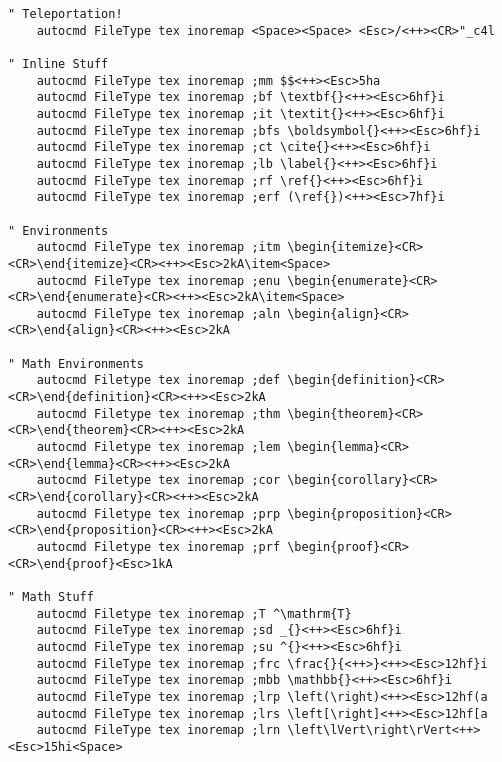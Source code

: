\begin{lstlisting}
" Teleportation!
    autocmd FileType tex inoremap <Space><Space> <Esc>/<++><CR>"_c4l

" Inline Stuff
    autocmd FileType tex inoremap ;mm $$<++><Esc>5ha
    autocmd FileType tex inoremap ;bf \textbf{}<++><Esc>6hf}i
    autocmd FileType tex inoremap ;it \textit{}<++><Esc>6hf}i
    autocmd FileType tex inoremap ;bfs \boldsymbol{}<++><Esc>6hf}i
    autocmd FileType tex inoremap ;ct \cite{}<++><Esc>6hf}i
    autocmd FileType tex inoremap ;lb \label{}<++><Esc>6hf}i
    autocmd FileType tex inoremap ;rf \ref{}<++><Esc>6hf}i
    autocmd FileType tex inoremap ;erf (\ref{})<++><Esc>7hf}i

" Environments
    autocmd FileType tex inoremap ;itm \begin{itemize}<CR><CR>\end{itemize}<CR><++><Esc>2kA\item<Space>
    autocmd FileType tex inoremap ;enu \begin{enumerate}<CR><CR>\end{enumerate}<CR><++><Esc>2kA\item<Space>
    autocmd FileType tex inoremap ;aln \begin{align}<CR><CR>\end{align}<CR><++><Esc>2kA

" Math Environments
    autocmd Filetype tex inoremap ;def \begin{definition}<CR><CR>\end{definition}<CR><++><Esc>2kA
    autocmd Filetype tex inoremap ;thm \begin{theorem}<CR><CR>\end{theorem}<CR><++><Esc>2kA
    autocmd Filetype tex inoremap ;lem \begin{lemma}<CR><CR>\end{lemma}<CR><++><Esc>2kA
    autocmd Filetype tex inoremap ;cor \begin{corollary}<CR><CR>\end{corollary}<CR><++><Esc>2kA
    autocmd Filetype tex inoremap ;prp \begin{proposition}<CR><CR>\end{proposition}<CR><++><Esc>2kA
    autocmd Filetype tex inoremap ;prf \begin{proof}<CR><CR>\end{proof}<Esc>1kA

" Math Stuff
    autocmd Filetype tex inoremap ;T ^\mathrm{T}
    autocmd FileType tex inoremap ;sd _{}<++><Esc>6hf}i
    autocmd FileType tex inoremap ;su ^{}<++><Esc>6hf}i
    autocmd FileType tex inoremap ;frc \frac{}{<++>}<++><Esc>12hf}i
    autocmd FileType tex inoremap ;mbb \mathbb{}<++><Esc>6hf}i
    autocmd FileType tex inoremap ;lrp \left(\right)<++><Esc>12hf(a
    autocmd FileType tex inoremap ;lrs \left[\right]<++><Esc>12hf[a
    autocmd FileType tex inoremap ;lrn \left\lVert\right\rVert<++><Esc>15hi<Space>
\end{lstlisting}


